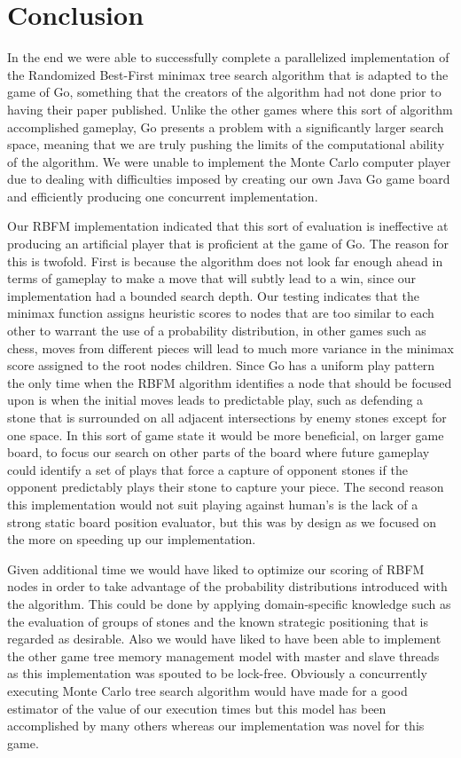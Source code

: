 \documentclass[conference]{IEEEtran}
\begin{document}
\section{Conclusion}
In the end we were able to successfully complete a parallelized implementation of the Randomized Best-First minimax tree search algorithm that is adapted to the game of Go, something that the creators of the algorithm had not done prior to having their paper published. Unlike the other games where this sort of algorithm accomplished gameplay, Go presents a problem with a significantly larger search space, meaning that we are truly pushing the limits of the computational ability of the algorithm. We were unable to implement the Monte Carlo computer player due to dealing with difficulties imposed by creating our own Java Go game board and efficiently producing one concurrent implementation.\par
Our RBFM implementation indicated that this sort of evaluation is ineffective at producing an artificial player that is proficient at the game of Go. The reason for this is twofold. First is because the algorithm does not look far enough ahead in terms of gameplay to make a move that will subtly lead to a win, since our implementation had a bounded search depth. Our testing indicates that the minimax function assigns heuristic scores to nodes that are too similar to each other to warrant the use of a probability distribution, in other games such as chess, moves from different pieces will lead to much more variance in the minimax score assigned to the root nodes children. Since Go has a uniform play pattern the only time when the RBFM algorithm identifies a node that should be focused upon is when the initial moves leads to predictable play, such as defending a stone that is surrounded on all adjacent intersections by enemy stones except for one space. In this sort of game state it would be more beneficial, on larger game board, to focus our search on other parts of the board where future gameplay could identify a set of plays that force a capture of opponent stones if the opponent predictably plays their stone to capture your piece. The second reason this implementation would not suit playing against human's is the lack of a strong static board position evaluator, but this was by design as we focused on the more on speeding up our implementation.\par
Given additional time we would have liked to optimize our scoring of RBFM nodes in order to take advantage of the probability distributions introduced with the algorithm. This could be done by applying domain-specific knowledge such as the evaluation of groups of stones and the known strategic positioning that is regarded as desirable. Also we would have liked to have been able to implement the other game tree memory management model with master and slave threads as this implementation was spouted to be lock-free. Obviously a concurrently executing Monte Carlo tree search algorithm would have made for a good estimator of the value of our execution times but this model has been accomplished by many others whereas our implementation was novel for this game.
\end{document}
